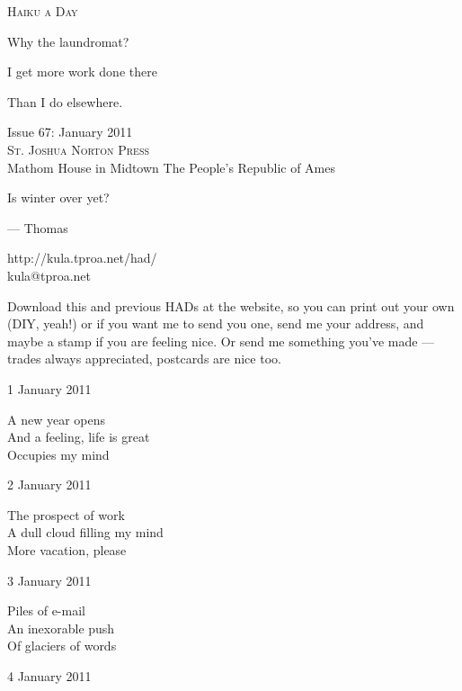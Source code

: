 \documentclass[12pt]{article}
\begin{document}
\begin{center}
{\fontsize{36}{48}\selectfont \textsc{Haiku a Day }}
\end{center}

\vspace*{3.5cm}

{\fontsize{20}{40}\selectfont 


Why the laundromat?

I get more work done there

Than I do elsewhere.

}

\vspace*{5.0cm}
\begin{center}
{\large{Issue 67: January 2011}} \\[5mm]
{\fontsize{8}{8}\selectfont  \textsc{ St. Joshua Norton Press }} \\[1mm]
{\fontsize{6}{6}\selectfont Mathom House in Midtown \textbar The People's Republic of Ames }
\end{center}


\newpage

Is winter over yet?

--- Thomas

http://kula.tproa.net/had/ \\
kula@tproa.net

Download this and previous HADs at the website, so you can
print out your own (DIY, yeah!) or if you want me to send
you one, send me your address, and maybe a stamp if you
are feeling nice. Or send me something you've made ---
trades always appreciated, postcards are nice too.

\vfill

1 January 2011

A new year opens \\
And a feeling, life is great \\
Occupies my mind

2 January 2011

The prospect of work \\
A dull cloud filling my mind \\
More vacation, please

3 January 2011

Piles of e-mail \\
An inexorable push \\ 
Of glaciers of words

\newpage

4 January 2011
\end{document}
